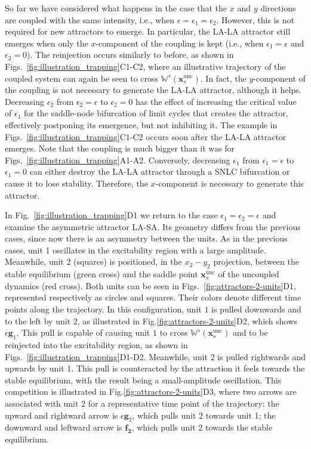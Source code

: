 So far we have considered what happens in the case that the $x$ and $y$ directions are coupled with the same intensity, i.e., when $\epsilon = \epsilon_1 = \epsilon_2$. However, this is not required for new attractors to emerge. In particular, the LA-LA attractor still emerges when only the $x$-component of the coupling is kept (i.e., when $\epsilon_1=\epsilon$ and $\epsilon_2 = 0$). The reinjection occurs similarly to before, as shown in Figs.~\ref{fig:illustration_trapping}C1-C2, where an illustrative trajectory of the coupled system can again be seen to cross $\mathbb{W}^s(\mathbf{x}_s^\mathrm{unc})$. In fact, the $y$-component of the coupling is not necessary to generate the LA-LA attractor, although it helps. Decreasing $\epsilon_2$ from $\epsilon_2=\epsilon$ to $\epsilon_2=0$ has the effect of increasing the critical value of $\epsilon_1$ for the saddle-node bifurcation of limit cycles that creates the attractor, effectively postponing its emergence, but not inhibiting it. The example in Figs.~\ref{fig:illustration_trapping}C1-C2 occurs soon after the LA-LA attractor emerges. Note that the coupling is much bigger than it was for Figs.~\ref{fig:illustration_trapping}A1-A2. Conversely, decreasing $\epsilon_1$ from $\epsilon_1 = \epsilon$ to $\epsilon_1 = 0$ can either destroy the LA-LA attractor through a SNLC bifurcation or cause it to lose stability. Therefore, the $x$-component is necessary to generate this attractor. 

In Fig.~\ref{fig:illustration_trapping}D1 we return to the case $\epsilon_1=\epsilon_2=\epsilon$ and examine the asymmetric attractor LA-SA. Its geometry differs from the previous cases, since now there is an asymmetry between the units. As in the previous cases, unit 1 oscillates in the excitability region with a large amplitude. Meanwhile, unit 2 (squares) is positioned, in the $x_2-y_2$ projection, between the stable equilibrium (green cross) and the saddle point $\mathbf{x}_s^\mathrm{unc}$ of the uncoupled dynamics (red cross). Both units can be seen in Figs.~\ref{fig:attractors-2-units}D1, represented respectively as circles and squares. Their colors denote different time points along the trajectory. In this configuration, unit $1$ is pulled downwards and to the left by unit 2, as illustrated in Fig.\ref{fig:attractors-2-units}D2, which shows $\epsilon \mathbf{g}_1$. This pull is capable of causing unit $1$ to cross $\mathbb{W}^s(\mathbf{x}_s^\mathrm{unc})$ and to be reinjected into the excitability region, as shown in Figs.~\ref{fig:illustration_trapping}D1-D2. Meanwhile, unit 2 is pulled rightwards and upwards by unit 1. This pull is counteracted by the attraction it feels towards the stable equilibrium, with the result being a small-amplitude oscillation. This competition is illustrated in Fig.\ref{fig:attractors-2-units}D3, where two arrows are associated with unit 2 for a representative time point of the trajectory: the upward and rightward arrow is $\epsilon \mathbf{g}_2$, which pulls unit 2 towards unit 1; the downward and leftward arrow is $\mathbf{f_2}$, which pulls unit 2 towards the stable equilibrium. 

